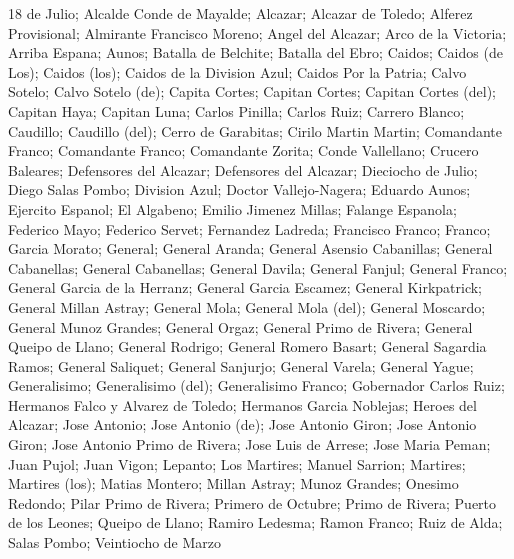 18 de Julio; Alcalde Conde de Mayalde; Alcazar; Alcazar de Toledo; Alferez Provisional; Almirante Francisco Moreno; Angel del Alcazar; Arco de la Victoria; Arriba Espana; Aunos; Batalla de Belchite; Batalla del Ebro; Caidos; Caidos (de Los); Caidos (los); Caidos de la Division Azul; Caidos Por la Patria; Calvo Sotelo; Calvo Sotelo (de); Capita Cortes; Capitan Cortes; Capitan Cortes (del); Capitan Haya; Capitan Luna; Carlos Pinilla; Carlos Ruiz; Carrero Blanco; Caudillo; Caudillo (del); Cerro de Garabitas; Cirilo Martin Martin; Comandante Franco; Comandante Franco; Comandante Zorita; Conde Vallellano; Crucero Baleares; Defensores del Alcazar; Defensores del Alcazar; Dieciocho de Julio; Diego Salas Pombo; Division Azul; Doctor Vallejo-Nagera; Eduardo Aunos; Ejercito Espanol; El Algabeno; Emilio Jimenez Millas; Falange Espanola; Federico Mayo; Federico Servet; Fernandez Ladreda; Francisco Franco; Franco; Garcia Morato; General; General Aranda; General Asensio Cabanillas; General Cabanellas; General Cabanellas; General Davila; General Fanjul; General Franco; General Garcia de la Herranz; General Garcia Escamez; General Kirkpatrick; General Millan Astray; General Mola; General Mola (del); General Moscardo; General Munoz Grandes; General Orgaz; General Primo de Rivera; General Queipo de Llano; General Rodrigo; General Romero Basart; General Sagardia Ramos; General Saliquet; General Sanjurjo; General Varela; General Yague; Generalisimo; Generalisimo (del); Generalisimo Franco; Gobernador Carlos Ruiz; Hermanos Falco y Alvarez de Toledo; Hermanos Garcia Noblejas; Heroes del Alcazar; Jose Antonio; Jose Antonio (de); Jose Antonio Giron; Jose Antonio Giron; Jose Antonio Primo de Rivera; Jose Luis de Arrese; Jose Maria Peman; Juan Pujol; Juan Vigon; Lepanto; Los Martires; Manuel Sarrion; Martires; Martires (los); Matias Montero; Millan Astray; Munoz Grandes; Onesimo Redondo; Pilar Primo de Rivera; Primero de Octubre; Primo de Rivera; Puerto de los Leones; Queipo de Llano; Ramiro Ledesma; Ramon Franco; Ruiz de Alda; Salas Pombo; Veintiocho de Marzo
